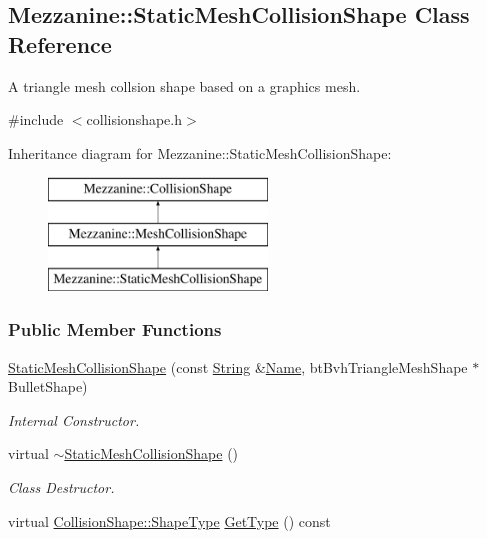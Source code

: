 \hypertarget{classMezzanine_1_1StaticMeshCollisionShape}{
\subsection{Mezzanine::StaticMeshCollisionShape Class Reference}
\label{classMezzanine_1_1StaticMeshCollisionShape}
}


A triangle mesh collsion shape based on a graphics mesh.  




{\ttfamily \#include $<$collisionshape.h$>$}

Inheritance diagram for Mezzanine::StaticMeshCollisionShape:\begin{figure}[H]
\begin{center}
\leavevmode
\includegraphics[height=3.000000cm]{classMezzanine_1_1StaticMeshCollisionShape}
\end{center}
\end{figure}
\subsubsection*{Public Member Functions}
\begin{DoxyCompactItemize}
\item 
\hyperlink{classMezzanine_1_1StaticMeshCollisionShape_a1c565cc4d62ab7a0cd5cf55254905f05}{StaticMeshCollisionShape} (const \hyperlink{namespaceMezzanine_acf9fcc130e6ebf08e3d8491aebcf1c86}{String} \&\hyperlink{classMezzanine_1_1CollisionShape_aac524c5c56fa4d158bc071f8aecfbe79}{Name}, btBvhTriangleMeshShape $\ast$BulletShape)
\begin{DoxyCompactList}\small\item\em Internal Constructor. \item\end{DoxyCompactList}\item 
\hypertarget{classMezzanine_1_1StaticMeshCollisionShape_af9e8c6e26fd7788af907801bc0126978}{
virtual \hyperlink{classMezzanine_1_1StaticMeshCollisionShape_af9e8c6e26fd7788af907801bc0126978}{$\sim$StaticMeshCollisionShape} ()}
\label{classMezzanine_1_1StaticMeshCollisionShape_af9e8c6e26fd7788af907801bc0126978}

\begin{DoxyCompactList}\small\item\em Class Destructor. \item\end{DoxyCompactList}\item 
virtual \hyperlink{classMezzanine_1_1CollisionShape_ad04186055565998879b64176d6dd100d}{CollisionShape::ShapeType} \hyperlink{classMezzanine_1_1StaticMeshCollisionShape_ae6cf497bf3a0c1db7b0f39a0513ebb79}{GetType} () const 
\end{DoxyCompactItemize}
